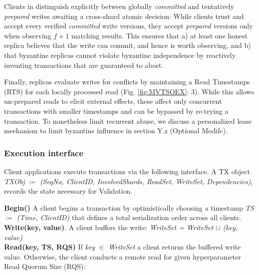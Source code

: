 Clients in \sys distinguish explicitly between globally \textit{committed} and tentatively \textit{prepared} writes awaiting a cross-shard atomic decision: While clients trust and accept every verified \textit{committed} write versions, they accept \textit{prepared} versions only when observing $f+1$ matching results. This ensures that a) at least one honest replica believes that the write can commit, and hence is worth observing, and b) that byzantine replicas cannot violate byzantine independence by reactively inventing transactions that are guaranteed to abort.

Finally, \sys replicas evaluate writes for conflicts by maintaining a Read Timestamps (RTS) for each locally processed read (Fig. \ref{fig:MVTSOEX}: 3). While this allows un-prepared reads to elicit external effects, these affect only concurrent transactions with smaller timestamps and can be bypassed by re-trying a transaction. To nonetheless limit recurrent abuse, we discuss a personalized lease mechanism to limit byzantine influence in section Y.z (Optional Modifc). 



\subsubsection{Execution interface}
Client applications execute transactions via the following interface. A TX object \textit{TXObj $\coloneqq$ (SeqNo, ClientID, InvolvedShards, ReadSet, WriteSet, Dependencies)}, records the state necessary for Validation.

\textbf{Begin()} A client begins a transaction by optimistically choosing a timestamp \textit{TS $\coloneqq$ (Time, ClientID)} that defines a total serialization order across all clients.  \\
\textbf{Write(key, value)}. A client buffers the write: \textit{WriteSet = WriteSet $\cup$ (key, value)}\\
\textbf{Read(key, TS, RQS)} 
If \textit{key $\in$ WriteSet} a client returns the buffered write value. Otherwise, the client conducts a remote read for given hyperparameter Read Quorum Size (RQS):

